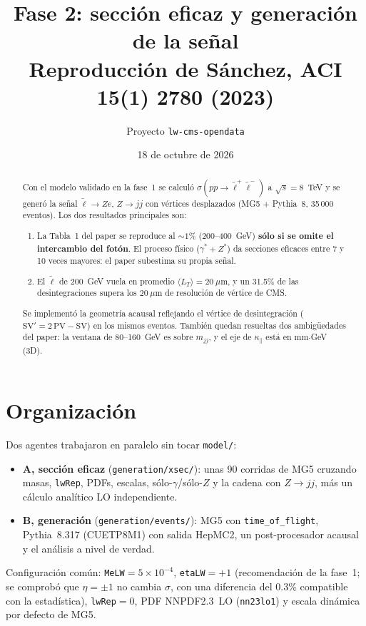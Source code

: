\documentclass[11pt,a4paper]{article}
\title{\textbf{Fase 2: sección eficaz y generación de la señal}\\[3pt]
\large Reproducción de Sánchez, ACI \textbf{15}(1) 2780 (2023)}
\author{Proyecto \texttt{lw-cms-opendata}}
\date{18 de octubre de 2026}
\newcommand{\lt}{\tilde{\ell}}
\newcommand{\kpar}{\kappa_{\parallel}}
\begin{document}
\sloppy
\maketitle

\begin{abstract}
\noindent Con el modelo validado en la fase~1 se calculó $\sigma(pp\to\lt^+\lt^-)$ a $\sqrt s=8$~TeV y se generó la señal $\lt\to Ze$, $Z\to jj$ con vértices desplazados (MG5 + Pythia~8, 35\,000 eventos). Los dos resultados principales son:
\begin{enumerate}
\item La Tabla~1 del paper se reproduce al $\sim1\%$ (200--400~GeV) \textbf{sólo si se omite el intercambio del fotón}. El proceso físico ($\gamma^*+Z^*$) da secciones eficaces entre 7 y 10 veces mayores: el paper subestima su propia señal.
\item El $\lt$ de 200~GeV vuela en promedio $\langle L_T\rangle=20~\mu$m, y un 31.5\% de las desintegraciones supera los $20~\mu$m de resolución de vértice de CMS.
\end{enumerate}
Se implementó la geometría acausal reflejando el vértice de desintegración ($\mathrm{SV}'=2\,\mathrm{PV}-\mathrm{SV}$) en los mismos eventos. También quedan resueltas dos ambigüedades del paper: la ventana de 80--160~GeV es sobre $m_{jj}$, y el eje de $\kpar$ está en mm$\cdot$GeV (3D).
\end{abstract}

\section{Organización}
Dos agentes trabajaron en paralelo sin tocar \texttt{model/}:
\begin{itemize}
\item \textbf{A, sección eficaz} (\texttt{generation/xsec/}): unas 90 corridas de MG5 cruzando masas, \texttt{lwRep}, PDFs, escalas, sólo-$\gamma$/sólo-$Z$ y la cadena con $Z\to jj$, más un cálculo analítico LO independiente.
\item \textbf{B, generación} (\texttt{generation/events/}): MG5 con \texttt{time\_of\_flight}, Pythia~8.317 (CUETP8M1) con salida HepMC2, un post-procesador acausal y el análisis a nivel de verdad.
\end{itemize}
Configuración común: \texttt{MeLW}$=5\times10^{-4}$, \texttt{etaLW}$=+1$ (recomendación de la fase~1; se comprobó que $\eta=\pm1$ no cambia $\sigma$, con una diferencia del 0.3\% compatible con la estadística), \texttt{lwRep}$=0$, PDF NNPDF2.3~LO (\texttt{nn23lo1}) y escala dinámica por defecto de MG5.
\end{document}

